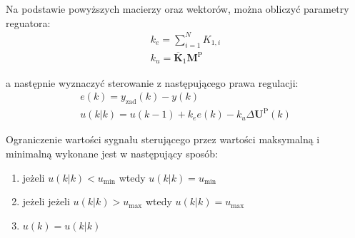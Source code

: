 Na podstawie powyższych macierzy oraz wektorów, można obliczyć parametry reguatora:
\begin{gather}
        k_e = \sum^N_{i=1}K_{1,i}\\
	k_u = \mathbf{\overline{K}}_1 \mathbf{M}^\textrm{P}
\end{gather}

a następnie wyznaczyć sterowanie z następującego prawa regulacji:
\begin{gather}
	e(k) = y_{\textrm{zad}}(k) - y(k)\\
    	u(k|k) = u(k - 1) + k_e e(k) - k_u \Delta \mathbf{U}^\textrm{P}(k)
\end{gather}

Ograniczenie wartości sygnału sterującego przez wartości maksymalną i minimalną wykonane jest w następujący sposób:
\begin{enumerate}
    \item jeżeli $u(k|k) < u_{\textrm{min}}$ wtedy $u(k|k) = u_{\textrm{min}}$
\item jeżeli jeżeli $u(k|k) > u_{\textrm{max}}$ wtedy $u(k|k) = u_{\textrm{max}}$
\item $u(k) = u(k|k)$
\end{enumerate}